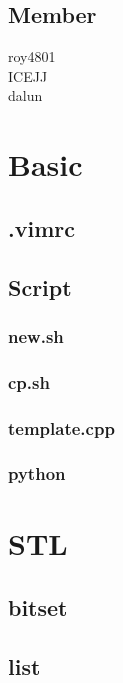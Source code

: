 \subsection{Member}
roy4801 \\
ICEJJ \\
dalun

\section{Basic}

\subsection{.vimrc}


\subsection{Script}
\subsubsection{new.sh}


\subsubsection{cp.sh}


\subsubsection{template.cpp}


\subsubsection{python}


\section{STL}

\subsection{bitset}


\subsection{list}


